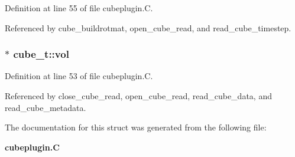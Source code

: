 Definition at line 55 of file cubeplugin.C.

Referenced by cube\_\-buildrotmat, open\_\-cube\_\-read, and read\_\-cube\_\-timestep.
\subsubsection{$\ast$ cube\_\-t::vol}\label{structcube__t_m8}




Definition at line 53 of file cubeplugin.C.

Referenced by close\_\-cube\_\-read, open\_\-cube\_\-read, read\_\-cube\_\-data, and read\_\-cube\_\-metadata.

The documentation for this struct was generated from the following file:\begin{CompactItemize}
\item 
{\bf cubeplugin.C}\end{CompactItemize}
